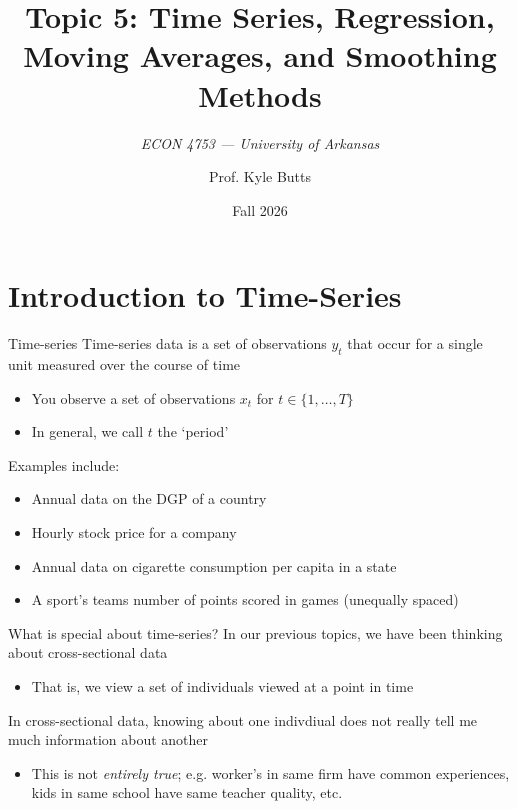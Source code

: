 \documentclass[aspectratio=169,t,11pt,table]{beamer}
\title{Topic 5: Time Series, Regression, Moving Averages, and Smoothing Methods}
\subtitle{\it  ECON 4753 — University of Arkansas}
\date{Fall 2026}
\author{Prof. Kyle Butts}
\begin{document}
\begin{frame}
\maketitle

\end{frame}

\section{Introduction to Time-Series}

\begin{frame}{Time-series}
  \alert{Time-series} data is a set of observations $y_t$ that occur for a single unit measured over the course of time
  \begin{itemize}
    \item You observe a set of observations $x_t$ for $t \in \{ 1, \dots, T \}$
    \item In general, we call $t$ the `period'
  \end{itemize}

  \pause
  \bigskip
  Examples include:
  \begin{itemize}
    \item Annual data on the DGP of a country
    \item Hourly stock price for a company
    \item Annual data on cigarette consumption per capita in a state 
    \item A sport's teams number of points scored in games (unequally spaced)
  \end{itemize}
\end{frame}


\begin{frame}{What is special about time-series?}
  In our previous topics, we have been thinking about \alert{cross-sectional} data
  \begin{itemize}
    \item That is, we view a set of individuals viewed at a point in time
  \end{itemize}

  \bigskip
  In cross-sectional data, knowing about one indivdiual does not really tell me much information about another
  \begin{itemize}
    \item This is not \emph{entirely true}; e.g. worker's in same firm have common experiences, kids in same school have same teacher quality, etc.
  \end{itemize}
\end{frame}
\end{document}
